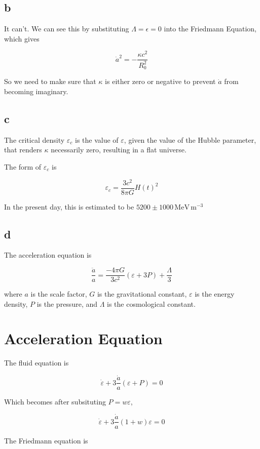 \documentclass[12pt]{article}
\begin{document}
\subsection*{b}

It can't. We can see this by substituting \(\Lambda = \epsilon = 0\) into the Friedmann Equation, which gives

\[ \dot{a}^2 = -\frac{\kappa c^2}{R_0^2}
\] 

So we need to make sure that \(\kappa\) is either zero or negative to prevent \(\dot{a}\) from becoming imaginary.

\subsection*{c}

The critical density \(\varepsilon_c\) is the value of \(\varepsilon\), given the value of the Hubble parameter, that renders \(\kappa\) necessarily zero, resulting in a flat universe.

The form of \(\varepsilon_c\) is 

\[ \varepsilon_c = \frac{3c^2}{8\pi G}H(t)^2
\]

In the present day, this is estimated to be \(5200 \pm 1000 \, \mathrm{MeV}\,\mathrm{m}^{-3}\) 

\subsection*{d}

The acceleration equation is

\[ \frac{\ddot{a}}{a} = \frac{-4\pi G}{3c^2}(\varepsilon + 3P) + \frac{\Lambda}{3}
\]

where \(a\) is the scale factor, \(G\) is the gravitational constant, \(\varepsilon\) is the energy density, \(P\) is the pressure, and \(\Lambda\) is the cosmological constant.

\section{Acceleration Equation}

The fluid equation is

\[\dot{\varepsilon} + 3\frac{\dot{a}}{a}(\varepsilon +P) = 0
\]

Which becomes after subsituting \(P=w\varepsilon\),

\[ \dot{\varepsilon} + 3\frac{\dot{a}}{a}(1+w)\varepsilon = 0
\]

The Friedmann equation is
\end{document}
